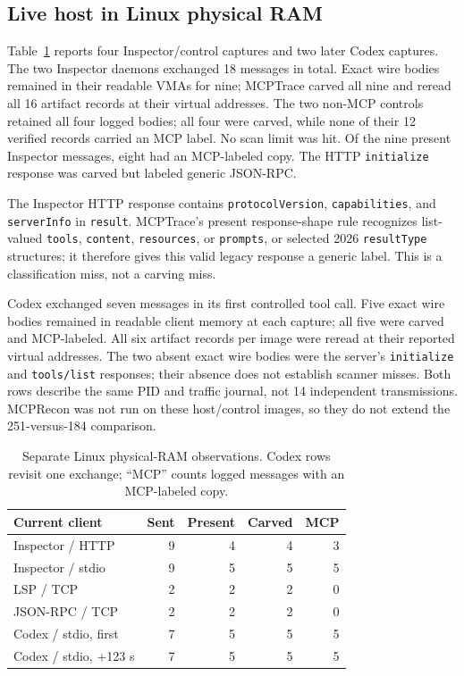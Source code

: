 \documentclass[conference,10pt]{IEEEtran}
\begin{document}
\subsection{Live host in Linux physical RAM}
Table~\ref{tab:live-ram} reports four Inspector/control captures and two later Codex captures. The two Inspector daemons exchanged 18 messages in total. Exact wire bodies remained in their readable VMAs for nine; MCPTrace carved all nine and reread all 16 artifact records at their virtual addresses. The two non-MCP controls retained all four logged bodies; all four were carved, while none of their 12 verified records carried an MCP label. No scan limit was hit. Of the nine present Inspector messages, eight had an MCP-labeled copy. The HTTP \texttt{initialize} response was carved but labeled generic JSON-RPC.

The Inspector HTTP response contains \texttt{protocolVersion}, \texttt{capabilities}, and \texttt{serverInfo} in \texttt{result}. MCPTrace's present response-shape rule recognizes list-valued \texttt{tools}, \texttt{content}, \texttt{resources}, or \texttt{prompts}, or selected 2026 \texttt{resultType} structures; it therefore gives this valid legacy response a generic label. This is a classification miss, not a carving miss.

Codex exchanged seven messages in its first controlled tool call. Five exact wire bodies remained in readable client memory at each capture; all five were carved and MCP-labeled. All six artifact records per image were reread at their reported virtual addresses. The two absent exact wire bodies were the server's \texttt{initialize} and \texttt{tools/list} responses; their absence does not establish scanner misses. Both rows describe the same PID and traffic journal, not 14 independent transmissions. MCPRecon was not run on these host/control images, so they do not extend the 251-versus-184 comparison.

\begin{table}[t]
\caption{Separate Linux physical-RAM observations. Codex rows revisit one exchange; ``MCP'' counts logged messages with an MCP-labeled copy.}
\label{tab:live-ram}
\centering
\footnotesize
\setlength{\tabcolsep}{3pt}
\begin{tabular}{lrrrr}
\toprule
Current client & Sent & Present & Carved & MCP \\
\midrule
Inspector / HTTP & 9 & 4 & 4 & 3 \\
Inspector / stdio & 9 & 5 & 5 & 5 \\
LSP / TCP & 2 & 2 & 2 & 0 \\
JSON-RPC / TCP & 2 & 2 & 2 & 0 \\
\midrule
Codex / stdio, first & 7 & 5 & 5 & 5 \\
Codex / stdio, +123 s & 7 & 5 & 5 & 5 \\
\bottomrule
\end{tabular}
\end{table}
\end{document}
